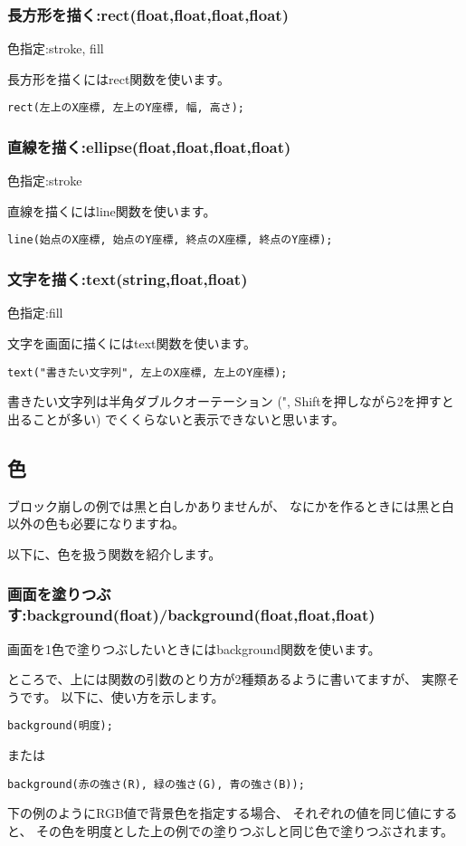 \documentclass[12pt,titlepage]{ltjsarticle}
\begin{document}
\subsubsection{長方形を描く:rect(float,float,float,float)}
色指定:stroke, fill

長方形を描くにはrect関数を使います。

\verb#rect(左上のX座標, 左上のY座標, 幅, 高さ);#

\subsubsection{直線を描く:ellipse(float,float,float,float)}
色指定:stroke

直線を描くにはline関数を使います。

\verb#line(始点のX座標, 始点のY座標, 終点のX座標, 終点のY座標);#

\subsubsection{文字を描く:text(string,float,float)}
色指定:fill

文字を画面に描くにはtext関数を使います。

\verb#text("書きたい文字列", 左上のX座標, 左上のY座標);#

書きたい文字列は半角ダブルクオーテーション
(", Shiftを押しながら2を押すと出ることが多い)
でくくらないと表示できないと思います。

\subsection{色}
ブロック崩しの例では黒と白しかありませんが、
なにかを作るときには黒と白以外の色も必要になりますね。

以下に、色を扱う関数を紹介します。
\subsubsection{画面を塗りつぶす:background(float)/background(float,float,float)}
画面を1色で塗りつぶしたいときにはbackground関数を使います。

ところで、上には関数の引数のとり方が2種類あるように書いてますが、
実際そうです。
以下に、使い方を示します。

\verb#background(明度);#


または

\verb#background(赤の強さ(R), 緑の強さ(G), 青の強さ(B));#

下の例のようにRGB値で背景色を指定する場合、
それぞれの値を同じ値にすると、
その色を明度とした上の例での塗りつぶしと同じ色で塗りつぶされます。
\end{document}

